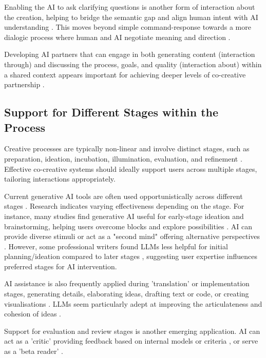 Enabling the AI to ask clarifying questions is another form of interaction about the creation, helping to bridge the semantic gap and align human intent with AI understanding \cite{Bown2020-oc, Coenen2021-ym}. This moves beyond simple command-response towards a more dialogic process where human and AI negotiate meaning and direction \cite{Bown2020-oc, Lin2023-jd}.

Developing AI partners that can engage in both generating content (interaction through) and discussing the process, goals, and quality (interaction about) within a shared context appears important for achieving deeper levels of co-creative partnership \cite{Davis2016-te, Bown2020-oc, Zhou2024-vp}.

\subsection{Support for Different Stages within the Process}

Creative processes are typically non-linear and involve distinct stages, such as preparation, ideation, incubation, illumination, evaluation, and refinement \cite{Wallas1926-ky, Design-Council2004-fv}. Effective co-creative systems should ideally support users across multiple stages, tailoring interactions appropriately.

Current generative AI tools are often used opportunistically across different stages \cite{Li2024-yh}. Research indicates varying effectiveness depending on the stage. For instance, many studies find generative AI useful for early-stage ideation and brainstorming, helping users overcome blocks and explore possibilities \cite{Calderwood2020-gg, Clark2018-yf, Wan2023-he, Mirowski2023-oz, Doshi2023-dv}. AI can provide diverse stimuli \cite{Haase2023-mz} or act as a "second mind" offering alternative perspectives \cite{Wan2023-he}. However, some professional writers found LLMs less helpful for initial planning/ideation compared to later stages \cite{Chakrabarty2024-ov}, suggesting user expertise influences preferred stages for AI intervention.

AI assistance is also frequently applied during 'translation' or implementation stages, generating details, elaborating ideas, drafting text or code, or creating visualisations \cite{Chakrabarty2024-ov, Yuan2022-kb, Lee2024-vz, Palani2024-on}. LLMs seem particularly adept at improving the articulateness and cohesion of ideas \cite{Lee2024-vz}.

Support for evaluation and review stages is another emerging application. AI can act as a 'critic' providing feedback based on internal models or criteria \cite{Lin2023-zq, Zhou2024-vp}, or serve as a 'beta reader' \cite{Ippolito2022-mf, Chakrabarty2024-ov}. 

